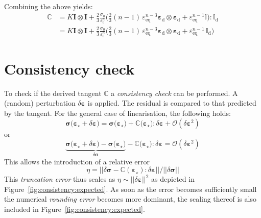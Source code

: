 \documentclass{goose-article}
\begin{document}
Combining the above yields:
\begin{align}
\mathbb{C}
&= K \bm{I} \otimes \bm{I} +
\frac{2}{3} \frac{\sigma_0}{\varepsilon_0^n}
\bigg(
  \tfrac{2}{3} (n-1) \, \varepsilon_\mathrm{eq}^{n-3}
  \bm{\varepsilon}_\mathrm{d} \otimes \bm{\varepsilon}_\mathrm{d}
  + \varepsilon_\mathrm{eq}^{n-1} \mathbb{I}
\bigg) : \mathbb{I}_\mathrm{d} \\
&= K \bm{I} \otimes \bm{I} +
\frac{2}{3} \frac{\sigma_0}{\varepsilon_0^n}
\bigg(
  \tfrac{2}{3} (n-1) \, \varepsilon_\mathrm{eq}^{n-3}
  \bm{\varepsilon}_\mathrm{d} \otimes \bm{\varepsilon}_\mathrm{d}
  + \varepsilon_\mathrm{eq}^{n-1} \, \mathbb{I}_\mathrm{d}
\bigg)
\end{align}

\section{Consistency check}

To check if the derived tangent $\mathbb{C}$ a \emph{consistency check} can be performed. A (random) perturbation $\delta \bm{\varepsilon}$ is applied. The residual is compared to that predicted by the tangent. For the general case of linearisation, the following holds:
%
\begin{equation}
  \bm{\sigma}\big( \bm{\varepsilon}_\star + \delta \bm{\varepsilon} \big) =
  \bm{\sigma}\big( \bm{\varepsilon}_\star \big) +
  \mathbb{C} \big( \bm{\varepsilon}_\star \big) : \delta \bm{\varepsilon} +
  \mathcal{O}(\delta \bm{\varepsilon}^2)
\end{equation}
%
or
%
\begin{equation}
  \underbrace{
    \bm{\sigma}\big( \bm{\varepsilon}_\star + \delta \bm{\varepsilon} \big) -
    \bm{\sigma}\big( \bm{\varepsilon}_\star \big)
  }_{
    \displaystyle \delta \bm{\sigma}
  } -
  \mathbb{C} \big( \bm{\varepsilon}_\star \big) : \delta \bm{\varepsilon} =
  \mathcal{O}(\delta \bm{\varepsilon}^2)
\end{equation}
%
This allows the introduction of a relative error
%
\begin{equation}
  \eta =
  \Big|\Big|
    \delta \bm{\sigma} -
    \mathbb{C}(\bm{\varepsilon}_\star) : \delta \bm{\varepsilon}
  \Big|\Big|
  /
  \Big|\Big| \delta \bm{\sigma} \Big|\Big|
\end{equation}
%
This \emph{truncation error} thus scales as $\eta \sim || \delta \bm{\varepsilon} ||^2$ as depicted in Figure~\ref{fig:consistency:expected}. As soon as the error becomes sufficiently small the numerical \emph{rounding error} becomes more dominant, the scaling thereof is also included in Figure~\ref{fig:consistency:expected}.
\end{document}
